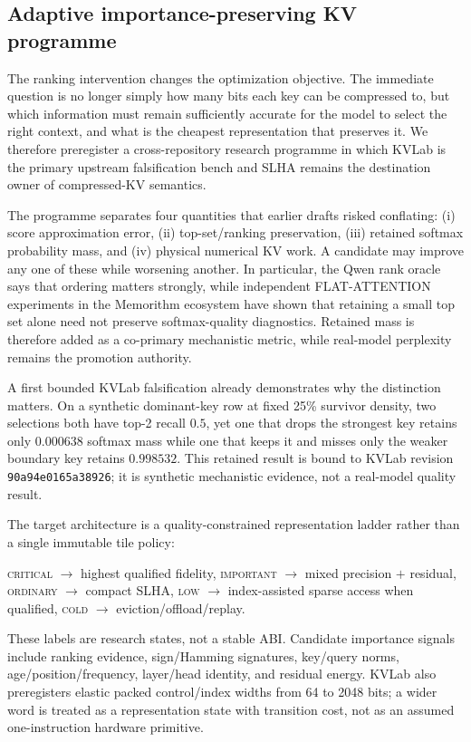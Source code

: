 \documentclass[11pt]{article}
\newenvironment{addedblock}{\begingroup\color{revisionblue}}{\endgroup}
\theoremstyle{plain}
\theoremstyle{definition}
\begin{document}
\subsection{Adaptive importance-preserving KV programme}
\label{sec:adaptive-kv}
\begin{addedblock}
The ranking intervention changes the optimization objective. The immediate
question is no longer simply how many bits each key can be compressed to, but
which information must remain sufficiently accurate for the model to select
the right context, and what is the cheapest representation that preserves it.
We therefore preregister a cross-repository research programme in which KVLab
is the primary upstream falsification bench and SLHA remains the destination
owner of compressed-KV semantics.

The programme separates four quantities that earlier drafts risked conflating:
(i) score approximation error, (ii) top-set/ranking preservation,
(iii) retained softmax probability mass, and (iv) physical numerical KV work.
A candidate may improve any one of these while worsening another. In
particular, the Qwen rank oracle says that ordering matters strongly, while
independent FLAT-ATTENTION experiments in the Memorithm ecosystem have shown
that retaining a small top set alone need not preserve softmax-quality
diagnostics. Retained mass is therefore added as a co-primary mechanistic
metric, while real-model perplexity remains the promotion authority.

A first bounded KVLab falsification already demonstrates why the distinction
matters. On a synthetic dominant-key row at fixed 25\% survivor density, two
selections both have top-2 recall $0.5$, yet one that drops the strongest key
retains only $0.000638$ softmax mass while one that keeps it and misses only
the weaker boundary key retains $0.998532$. This retained result is bound to
KVLab revision \texttt{90a94e0165a38926}; it is synthetic mechanistic
evidence, not a real-model quality result.

The target architecture is a quality-constrained representation ladder rather
than a single immutable tile policy:
\begin{center}
\small
\textsc{critical} $\rightarrow$ highest qualified fidelity,\quad
\textsc{important} $\rightarrow$ mixed precision $+$ residual,\quad
\textsc{ordinary} $\rightarrow$ compact SLHA,\quad
\textsc{low} $\rightarrow$ index-assisted sparse access when qualified,\quad
\textsc{cold} $\rightarrow$ eviction/offload/replay.
\end{center}
These labels are research states, not a stable ABI. Candidate importance
signals include ranking evidence, sign/Hamming signatures, key/query norms,
age/position/frequency, layer/head identity, and residual energy. KVLab also
preregisters elastic packed control/index widths from 64 to 2048 bits; a wider
word is treated as a representation state with transition cost, not as an
assumed one-instruction hardware primitive.


\end{addedblock}
\end{document}
